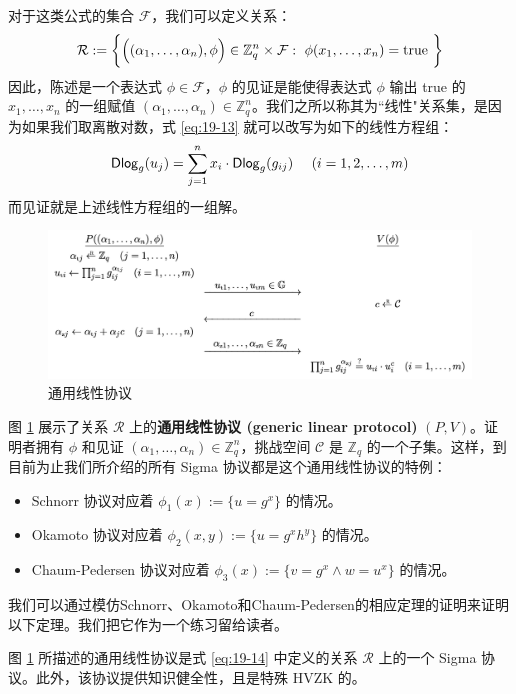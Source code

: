 对于这类公式的集合 $\mathcal{F}$，我们可以定义关系：
\begin{equation}\label{eq:19-14}
\mathcal{R}:=
\bigg\lbrace
\Big(
(\alpha_1,\dots,\alpha_n),\phi
\Big)
\in\mathbb{Z}_q^n\times\mathcal{F}: ~\phi(x_1,\dots,x_n)={\rm{true}}~
\bigg\rbrace
\end{equation}
因此，陈述是一个表达式 $\phi\in\mathcal{F}$，$\phi$ 的见证是能使得表达式 $\phi$ 输出 true 的 $x_1,\dots,x_n$ 的一组赋值 $(\alpha_1,\dots,\alpha_n)\in\mathbb{Z}_q^n$。我们之所以称其为``线性"关系集，是因为如果我们取离散对数，式 \ref{eq:19-13} 就可以改写为如下的线性方程组：
$$
{\rm\mathsf{Dlog}}_g(u_j)=\sum_{j=1}^nx_i\cdot {\rm\mathsf{Dlog}}_g(g_{ij})~~~~(i=1,2,\dots,m)
$$
而见证就是上述线性方程组的一组解。

\begin{figure}
  \centering
  \includegraphics[width=0.85\linewidth]{figures/chapter19/fig8.png}
  \caption{通用线性协议}
  \label{fig:19-8}
\end{figure}

图 \ref{fig:19-8} 展示了关系 $\mathcal{R}$ 上的\textbf{通用线性协议 (generic linear protocol)} $(P,V)$。证明者拥有 $\phi$ 和见证 $(\alpha_1,\dots,\alpha_n)\in\mathbb{Z}_q^n$，挑战空间 $\mathcal{C}$ 是 $\mathbb{Z}_q$ 的一个子集。这样，到目前为止我们所介绍的所有 Sigma 协议都是这个通用线性协议的特例：
\begin{itemize}
	\item Schnorr 协议对应着 $\phi_1(x):=\{u=g^x\}$ 的情况。
	\item Okamoto 协议对应着 $\phi_2(x,y):=\{u=g^xh^y\}$ 的情况。
	\item Chaum-Pedersen 协议对应着 $\phi_3(x):=\{v=g^x\land w=u^x\}$ 的情况。
\end{itemize}

我们可以通过模仿Schnorr、Okamoto和Chaum-Pedersen的相应定理的证明来证明以下定理。我们把它作为一个练习留给读者。

\begin{theorem}\label{theo:19-11}
图 \ref{fig:19-8} 所描述的通用线性协议是式 \ref{eq:19-14} 中定义的关系 $\mathcal R$ 上的一个 Sigma 协议。此外，该协议提供知识健全性，且是特殊 HVZK 的。
\end{theorem}

